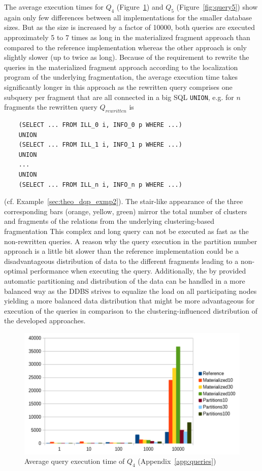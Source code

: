 The average execution times for $Q_4$ (Figure~\ref{fig:query4}) and $Q_5$ (Figure~\ref{fig:query5}) show again only few differences between all 
implementations for the smaller database sizes. But as the size is increased by a factor of 10000, both queries are executed approximately 5 to 7 times as long 
in the materialized fragment approach than compared to the reference implementation whereas the other approach is only slightly slower (up to twice as long).
Because of the requirement to rewrite the queries in the materialized fragment approach according to the localization program of the underlying fragmentation,
the average execution time takes significantly longer in this approach as the rewritten query comprises one subquery per fragment that are all connected in a 
big SQL \verb!UNION!, e.g. for $n$ fragments the rewritten query $Q_{rewritten}$ is
\begin{verbatim}
    (SELECT ... FROM ILL_0 i, INFO_0 p WHERE ...)
    UNION
    (SELECT ... FROM ILL_1 i, INFO_1 p WHERE ...)
    UNION
    ...
    UNION
    (SELECT ... FROM ILL_n i, INFO_n p WHERE ...)
\end{verbatim}
(cf. Example~\ref{sec:theo_dqp_exmp2}). The stair-like appearance of the three corresponding bars (orange, yellow, green) mirror the total number of clusters 
and fragments of the relations from the underlying clustering-based fragmentation This complex and long query can not be executed as fast as the non-rewritten
queries. A reason why the query execution in the partition number approach is a little bit slower than the reference implementation could be a disadvantageous
distribution of data to the different fragments leading to a non-optimal performance when executing the query. Additionally, the by  provided
automatic partitioning and distribution of the data can be handled in a more balanced way as the DDBS strives to equalize the load on all participating nodes
yielding a more balanced data distribution that might be more advantageous for execution of the queries in comparison to the clustering-influenced distribution
of the developed approaches.
\begin{figure}[h]
    \centering
    \includegraphics[scale=0.8]{charts/Query4.pdf}
    \caption{Average query execution time of $Q_4$ (Appendix~\ref{app:queries})}
    \label{fig:query4}
\end{figure}

